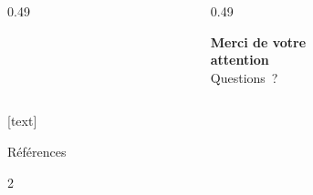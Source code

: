 ﻿%
\begin{frame}[plain]
\begin{columns}[t,totalwidth=1.05\textwidth]
\begin{column}{0.49\textwidth}
\end{column}
\begin{column}{0.49\textwidth}
\begin{center}
\textbf{\Large Merci de votre\\attention}\\
\vspace*{1.5cm}
{\huge\color{blue!75!white}Questions~?}
\end{center}
\end{column}
\end{columns}
\end{frame}

[text]
\begin{frame}[t]{Références}
\footnotesize\setlength{\bibsep}{0.15em}
\begin{multicols}{2}


\end{multicols}
\end{frame}


